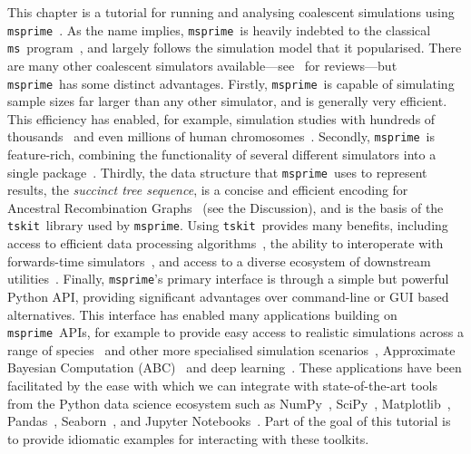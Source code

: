 \documentclass[graybox]{svmult}
\newcommand{\msprime}[0]{\texttt{msprime}}
\newcommand{\tskit}[0]{\texttt{tskit}}
\newcommand{\ms}[0]{\texttt{ms}}
\begin{document}
This chapter is a tutorial for running and analysing coalescent simulations
using \msprime~\citep{kelleher2016efficient,baumdicker2022efficient}.
As the name implies, \msprime\ is heavily indebted to the classical
\ms\ program~\citep{hudson2002generating}, and largely follows the
simulation model that it popularised.
There are many other coalescent simulators available---see~\citep{carvajal2008simulation,liu2008survey,arenas2012simulation,
yuan2012overview,hoban2012computer} for reviews---but \msprime\ has
some distinct advantages.
Firstly, \msprime\ is capable of simulating
sample sizes far larger than any other simulator, and is generally
very efficient. This efficiency has enabled, for example,
simulation
studies with hundreds of
thousands~\citep{martin2017human,martin2020correction,ragsdale2020lessons}
and even millions of human chromosomes~\citep{andersontrocme2023genes}.
Secondly, \msprime\ is feature-rich, combining the functionality of
several different simulators into a single
package~\citep{baumdicker2022efficient}.
Thirdly, the data structure that \msprime\ uses
to represent results,
the \emph{succinct tree sequence},
is a concise and efficient encoding 
for Ancestral Recombination Graphs~\citep{wong2024general}
(see the Discussion),
and is the basis of the \tskit\ library used by \msprime.
Using \tskit\ provides many benefits, including access to efficient
data processing algorithms~\citep{ralph2020efficiently,lehmann2025on},
the ability to interoperate with forwards-time
simulators~\citep{kelleher2018efficient,haller2018tree},
and access to a diverse ecosystem of downstream 
utilities~\cite{fan2022genealogical,nowbandegani2023extremely,tsambos2023link,
tagami2024tstrait,fritze2024forest}.
Finally, \msprime's primary interface is through a simple but powerful Python
API, providing significant advantages over command-line or GUI based alternatives.
This interface has enabled many applications building
on \msprime\ APIs, for example to provide easy access to
realistic simulations across a range of
species~\citep{adrion2020stdpopsim,lauterbur2023expanding,gower2025accessible}
and other more specialised simulation
scenarios~\citep{mckenzie2020ipcoal,rivera2021simulation,petrslendr2023,laetsch2023demographically},
Approximate Bayesian Computation (ABC)~\citep{huang2025estimating}
and deep learning~\cite{korfmann2023deep}.
These applications have been facilitated by the ease with
which we can integrate with state-of-the-art tools from the
Python data science ecosystem such as
NumPy~\citep{walt2011numpy,harris2020array},
SciPy~\citep{jones-2018-scipy},
Matplotlib~\citep{hunter2007matplotlib}, Pandas~\citep{mckinney2010data},
Seaborn~\citep{michael_waskom_2017_883859}, and
Jupyter Notebooks~\citep{perez2007ipython}. Part of the goal
of this tutorial is to provide idiomatic examples for interacting
with these toolkits.
\end{document}

